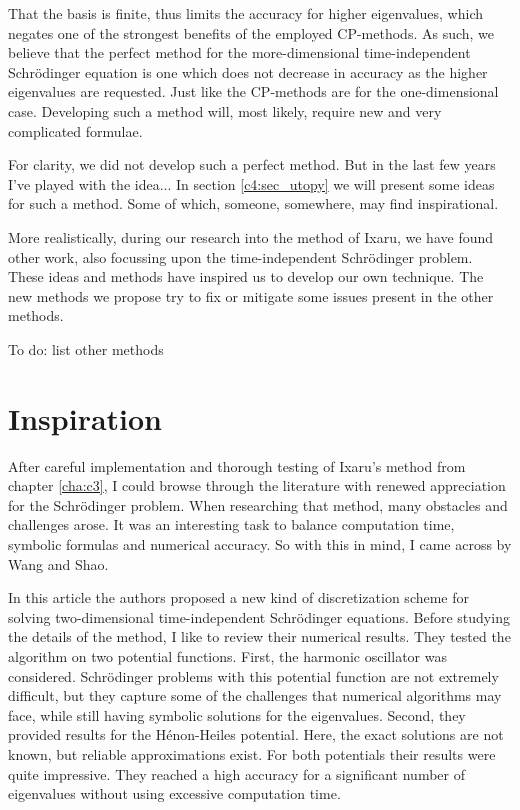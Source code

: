 That the basis is finite, thus limits the accuracy for higher eigenvalues, which negates one of the strongest benefits of the employed CP-methods. As such, we believe that the perfect method for the more-dimensional time-independent Schrödinger equation is one which does not decrease in accuracy as the higher eigenvalues are requested. Just like the CP-methods are for the one-dimensional case. Developing such a method will, most likely, require new and very complicated formulae.

For clarity, we did not develop such a perfect method. But in the last few years I've played with the idea... In section \ref{c4:sec_utopy} we will present some ideas for such a method. Some of which, someone, somewhere, may find inspirational.

More realistically, during our research into the method of Ixaru, we have found other work, also focussing upon the time-independent Schrödinger problem. These ideas and methods have inspired us to develop our own technique. The new methods we propose try to fix or mitigate some issues present in the other methods.

    {\color{red} To do: list other methods}

\section{Inspiration}

After careful implementation and thorough testing of Ixaru's method from chapter \ref{cha:c3}, I could browse through the literature with renewed appreciation for the Schrödinger problem. When researching that method, many obstacles and challenges arose. It was an interesting task to balance computation time, symbolic formulas and numerical accuracy. So with this in mind, I came across \cite{wang_new_2009} by Wang and Shao.

In this article the authors proposed a new kind of discretization scheme for solving two-dimensional time-independent Schrödinger equations. Before studying the details of the method, I like to review their numerical results. They tested the algorithm on two potential functions. First, the harmonic oscillator was considered. Schrödinger problems with this potential function are not extremely difficult, but they capture some of the challenges that numerical algorithms may face, while still having symbolic solutions for the eigenvalues. Second, they provided results for the Hénon-Heiles potential. Here, the exact solutions are not known, but reliable approximations exist. For both potentials their results were quite impressive. They reached a high accuracy for a significant number of eigenvalues without using excessive computation time.

